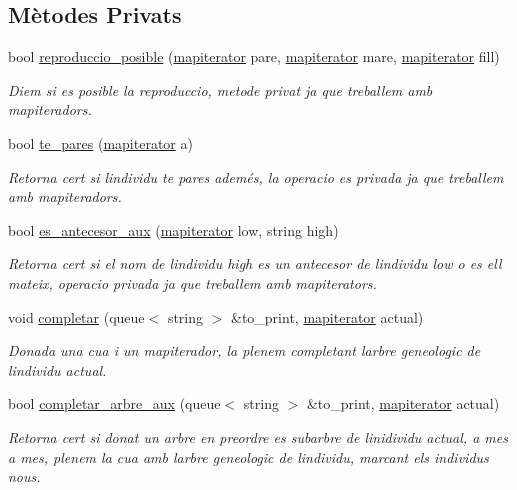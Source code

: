\subsection*{Mètodes Privats}
\begin{DoxyCompactItemize}
\item 
bool \hyperlink{classpoblacio_ad8651d82e2eb8863e853d57d9b8b9985}{reproduccio\+\_\+posible} (\hyperlink{classpoblacio_a52c3d96b08f7679f27487e7499185ed1}{mapiterator} pare, \hyperlink{classpoblacio_a52c3d96b08f7679f27487e7499185ed1}{mapiterator} mare, \hyperlink{classpoblacio_a52c3d96b08f7679f27487e7499185ed1}{mapiterator} fill)
\begin{DoxyCompactList}\small\item\em Diem si es posible la reproduccio, metode privat ja que treballem amb mapiteradors. \end{DoxyCompactList}\item 
bool \hyperlink{classpoblacio_a03e79690411d8ca8aa7d1e5646ca1c19}{te\+\_\+pares} (\hyperlink{classpoblacio_a52c3d96b08f7679f27487e7499185ed1}{mapiterator} a)
\begin{DoxyCompactList}\small\item\em Retorna cert si l\textquotesingle{}individu te pares ademés, la operacio es privada ja que treballem amb mapiteradors. \end{DoxyCompactList}\item 
bool \hyperlink{classpoblacio_a068248eaa6d1090e4114e2c799c850b1}{es\+\_\+antecesor\+\_\+aux} (\hyperlink{classpoblacio_a52c3d96b08f7679f27487e7499185ed1}{mapiterator} low, string high)
\begin{DoxyCompactList}\small\item\em Retorna cert si el nom de l\textquotesingle{}individu high es un antecesor de l\textquotesingle{}individu low o es ell mateix, operacio privada ja que treballem amb mapiterator\textquotesingle{}s. \end{DoxyCompactList}\item 
void \hyperlink{classpoblacio_a90b5d501f5b346aecb3c1ba170b3fb6f}{completar} (queue$<$ string $>$ \&to\+\_\+print, \hyperlink{classpoblacio_a52c3d96b08f7679f27487e7499185ed1}{mapiterator} actual)
\begin{DoxyCompactList}\small\item\em Donada una cua i un mapiterador, la plenem completant l\textquotesingle{}arbre geneologic de l\textquotesingle{}individu actual. \end{DoxyCompactList}\item 
bool \hyperlink{classpoblacio_a85493b733f10c8a276986a5a32404352}{completar\+\_\+arbre\+\_\+aux} (queue$<$ string $>$ \&to\+\_\+print, \hyperlink{classpoblacio_a52c3d96b08f7679f27487e7499185ed1}{mapiterator} actual)
\begin{DoxyCompactList}\small\item\em Retorna cert si donat un arbre en preordre es subarbre de l\textquotesingle{}inidividu actual, a mes a mes, plenem la cua amb l\textquotesingle{}arbre geneologic de l\textquotesingle{}individu, marcant els individus nous. \end{DoxyCompactList}\end{DoxyCompactItemize}
